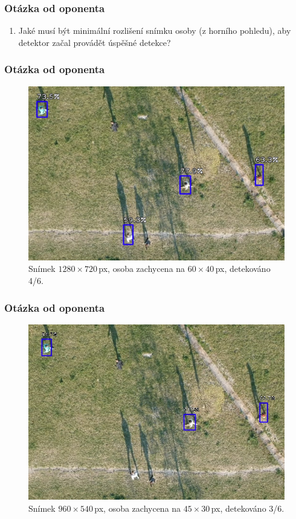 \documentclass[11pt,xcolor=pdflatex]{beamer}
\begin{document}

\appendix

\begin{frame}\frametitle{Otázka od oponenta}
    \begin{enumerate}
        \item Jaké musí být minimální rozlišení snímku osoby (z horního pohledu), aby detektor začal provádět úspěšné detekce?
    \end{enumerate}                
\end{frame}

\begin{frame}\frametitle{Otázka od oponenta}
    \begin{figure}[H]
        \centering
        \includegraphics[width=.9\linewidth]{images/oponent-100.jpg}
        \caption{Snímek $1280 \times 720$\,px, osoba zachycena na $60 \times 40$\,px, detekováno 4/6.}
    \end{figure}                
\end{frame}

\begin{frame}\frametitle{Otázka od oponenta}
    \begin{figure}[H]
        \centering
        \includegraphics[width=.9\linewidth]{images/oponent-75.jpg}
        \caption{Snímek $960 \times 540$\,px, osoba zachycena na $45 \times 30$\,px, detekováno 3/6.}
    \end{figure}                
\end{frame}
\end{document}
